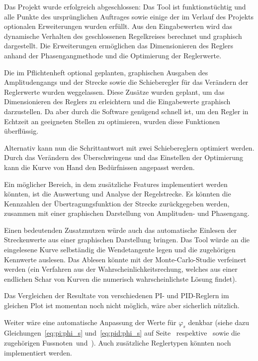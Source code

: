 Das Projekt  wurde erfolgreich abgeschlossen: Das Tool  ist funktionst\"uchtig
und alle Punkte des urspr\"unglichen Auftrages sowie einige der im Verlauf des
Projekts  optionalen  Erweiterungen  wurden erf\"ullt. Aus  den  Eingabewerten
wird  das dynamische  Verhalten des  geschlossenen Regelkreises  berechnet und
graphisch dargestellt. Die Erweiterungen  erm\"oglichen das Dimensionieren des
Reglers anhand der Phasengangmethode und die Optimierung der Reglerwerte.


Die   im   Pflichtenheft   optional  geplanten,   graphischen   Ausgaben   des
Amplitudengangs und der Strecke sowie  die Schieberegler f\"ur das Ver\"andern
der  Reglerwerte wurden  weggelassen. Diese Zus\"atze  wurden geplant,  um das
Dimensionieren  des  Reglers zu  erleichtern  und  die Eingabewerte  graphisch
darzustellen. Da aber durch die Software gen\"ugend schnell ist, um den Regler
in  Echtzeit an  geeigneten  Stellen zu  optimieren,  wurden diese  Funktionen
\"uberfl\"ussig.


Alternativ  kann  nun die  Schrittantwort  mit  zwei Schiebereglern  optimiert
werden. Durch  das Ver\"andern  des  \"Uberschwingens und  das Einstellen  der
Optimierung kann die Kurve von Hand den Bed\"urfnissen angepasst werden.


Ein m\"oglicher  Bereich, in  dem zus\"atzliche Features  implementiert werden
k\"onnten, ist die  Auswertung und Analyse der  Regelstrecke. Es k\"onnten die
Kennzahlen  der  \"Ubertragungsfunktion  der Strecke  zur\"uckgegeben  werden,
zusammen mit einer graphischen Darstellung von Amplituden- und Phasengang.


Einen  bedeutenden   Zusatznutzen  w\"urde  auch  das   automatische  Einlesen
der  Streckenwerte   aus  einer  graphischen  Darstellung   bringen. Das  Tool
w\"urde   an   die   eingelesene   Kurve   selbst\"andig   die   Wendetangente
legen  und   die  zugeh\"origen   Kennwerte  auslesen. Das   Ablesen  k\"onnte
mit  der   Monte-Carlo-Studie  verfeinert   werden  (ein  Verfahren   aus  der
Wahrscheinlichkeitsrechung, welches  aus einer endlichen Schar  von Kurven die
numerisch wahrscheinlichste L\"osung findet).


Das  Vergleichen  der  Resultate  von verschiedenen  PI-  und  PID-Reglern  im
gleichen  Plot  ist momentan  noch  nicht  m\"oglich, w\"are  aber  sicherlich
n\"utzlich.


Weiter  w\"are  eine  automatische   Anpassung  der  Werte  f\"ur  $\varphi_s$
denkbar   (siehe  dazu   Gleichungen~\ref{eq:pi:phi_s}  und~\ref{eq:pid:phi_s}
auf   Seite~\pageref{eq:pi:phi_s}    respektive~\pageref{eq:pid:phi_s}   sowie
die   zugeh\"origen   Fussnoten~\footnotemark[4]   und~\footnotemark[7]). Auch
zus\"atzliche Reglertypen k\"onnten noch implementiert werden.
